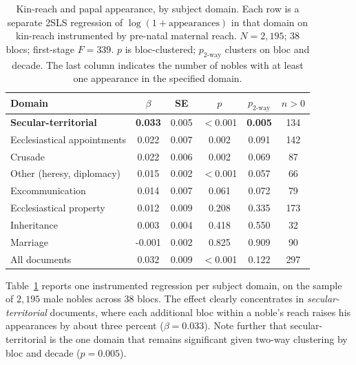 \documentclass[12pt]{article}
\theoremstyle{definition}
\theoremstyle{remark}
\begin{document}



\begin{table}[t]
\centering
\caption{Kin-reach and papal appearance, by subject domain. Each row is a separate 2SLS regression of $\log(1+\text{appearances})$ in that domain on kin-reach instrumented by pre-natal maternal reach. $N=2,195$; $38$ blocs; first-stage $F=339$. $p$ is bloc-clustered; $p_{\text{2-way}}$ clusters on bloc and decade. The last column indicates the number of nobles with at least one appearance in the specified domain.}
\label{tab:forward}
\begin{tabular}{lccccc}
\toprule
Domain & $\beta$ & SE & $p$ & $p_{\text{2-way}}$ & $n>0$ \\
\midrule
\textbf{Secular-territorial} & \textbf{0.033} & 0.005 & $<$0.001 & \textbf{0.005} & 134 \\
Ecclesiastical appointments & 0.022 & 0.007 & 0.002 & 0.091 & 142 \\
Crusade & 0.022 & 0.006 & 0.002 & 0.069 & 87 \\
Other (heresy, diplomacy) & 0.015 & 0.002 & $<$0.001 & 0.057 & 66 \\
Excommunication & 0.014 & 0.007 & 0.061 & 0.072 & 79 \\
Ecclesiastical property & 0.012 & 0.009 & 0.208 & 0.335 & 173 \\
Inheritance & 0.003 & 0.004 & 0.418 & 0.550 & 32 \\
Marriage & -0.001 & 0.002 & 0.825 & 0.909 & 90 \\
\midrule
All documents & 0.032 & 0.009 & $<$0.001 & 0.122 & 297 \\
\bottomrule
\end{tabular}
\end{table}



Table~\ref{tab:forward} reports one instrumented regression per subject domain, on the sample of $2{,}195$ male nobles across $38$ blocs. The effect clearly concentrates in \emph{secular-territorial} documents, where each additional bloc within a noble's reach raises his appearances by about three percent ($\beta=0.033$). Note further that secular-territorial is the one domain that remains significant given two-way clustering by bloc and decade ($p=0.005$).
\end{document}
